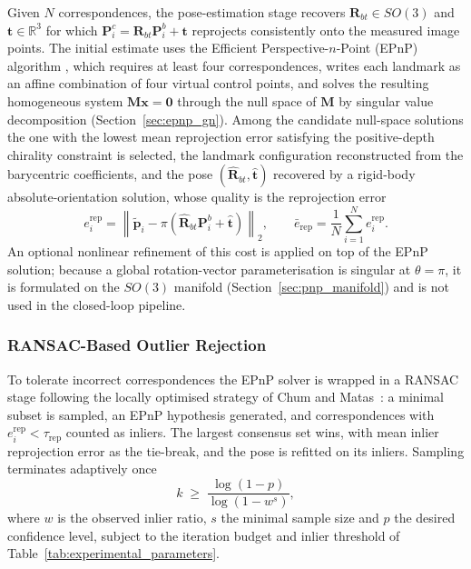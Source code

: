 Given $N$ correspondences, the pose-estimation stage recovers
$\mathbf{R}_{bt}\in SO(3)$ and $\mathbf{t}\in\mathbb{R}^{3}$ for which
$\mathbf{P}_i^c=\mathbf{R}_{bt}\mathbf{P}_i^b+\mathbf{t}$ reprojects
consistently onto the measured image points. The initial estimate uses the
Efficient Perspective-$n$-Point (EPnP) algorithm \cite{lepetit2009epnp},
which requires at least four correspondences, writes each landmark as an
affine combination of four virtual control points, and solves the resulting
homogeneous system $\mathbf{M}\mathbf{x}=\mathbf{0}$ through the null space
of $\mathbf{M}$ by singular value decomposition
(Section~\ref{sec:epnp_gn}). Among the candidate null-space solutions the one
with the lowest mean reprojection error satisfying the positive-depth
chirality constraint is selected, the landmark configuration reconstructed
from the barycentric coefficients, and the pose
$(\hat{\mathbf{R}}_{bt},\hat{\mathbf{t}})$ recovered by a rigid-body
absolute-orientation solution, whose quality is the reprojection error
\begin{equation}
    e_i^{\mathrm{rep}}
    =
    \left\|
    \tilde{\mathbf{p}}_i
    -
    \pi\left(\hat{\mathbf{R}}_{bt}\mathbf{P}_i^b+\hat{\mathbf{t}}\right)
    \right\|_2,
    \qquad
    \bar e_{\mathrm{rep}}
    =
    \frac{1}{N}\sum_{i=1}^{N} e_i^{\mathrm{rep}} .
\end{equation}
An optional nonlinear refinement of this cost is applied on top of the EPnP
solution; because a global rotation-vector parameterisation is singular at
$\theta=\pi$, it is formulated on the $SO(3)$ manifold
(Section~\ref{sec:pnp_manifold}) and is not used in the closed-loop pipeline.

\subsubsection{RANSAC-Based Outlier Rejection}

To tolerate incorrect correspondences the EPnP solver is wrapped in a RANSAC
stage \cite{fischler1981ransac} following the locally optimised strategy of
Chum and Matas~\cite{chum2003loransac}: a minimal subset is sampled, an EPnP
hypothesis generated, and correspondences with
$e_i^{\mathrm{rep}}<\tau_{\mathrm{rep}}$ counted as inliers. The largest
consensus set wins, with mean inlier reprojection error as the tie-break, and
the pose is refitted on its inliers. Sampling terminates adaptively once
\begin{equation}
    k \;\geq\; \frac{\log(1-p)}{\log\!\left(1-w^{s}\right)},
\end{equation}
where $w$ is the observed inlier ratio, $s$ the minimal sample size and $p$
the desired confidence level, subject to the iteration budget and inlier
threshold of Table~\ref{tab:experimental_parameters}.

